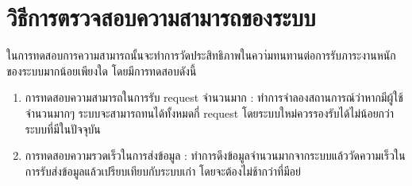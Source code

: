 \section{วิธีการตรวจสอบความสามารถของระบบ}
ในการทดสอบการความสามารถนั้นจะทำการวัดประสิทธิภาพในควา่มทนทานต่อการรับภาระงานหนักของระบบมากน้อยเพียงใด โดยมีการทดสอบดังนี้
\begin{enumerate}
    \item การทดสอบความสามารถในการรับ request จำนวนมาก : ทำการจำลองสถานการณ์ว่าหากมีผู้ใช้จำนวนมากๆ ระบบจะสามารถทนได้ทั้งหมดกี่ 
    request โดยระบบใหม่ควรรองรับได้ไม่น้อยกว่าระบบที่มีในปัจจุบัน
    \item การทดสอบความรวดเร็วในการส่งข้อมูล : ทำการดึงข้อมูลจำนวนมากจากระบบแล้ววัดความเร็วในการรับส่งข้อมูลแล้วเปรียบเทียบกับระบบเก่า โดยจะต้องไม่ช้ากว่าที่มีอย่
\end{enumerate}
